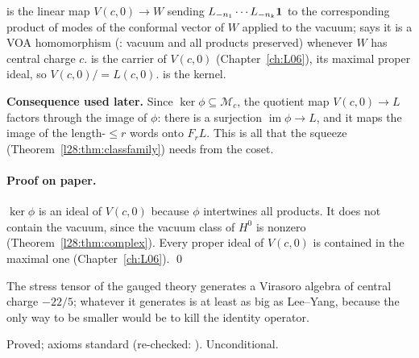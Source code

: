 \begin{dictionary}
 is the linear map $V(c,0)\to W$ sending $L_{-n_1}\cdots L_{-n_k}\mathbf 1$ to the corresponding product of modes of
the conformal vector of $W$ applied to the vacuum;  says it is a VOA homomorphism (: vacuum and
all products preserved) whenever $W$ has central charge $c$.  is the carrier of $V(c,0)$ (Chapter~\ref{ch:L06}),
 its maximal proper ideal, so $V(c,0)/$$=L(c,0)$.  is the kernel.

\textbf{Consequence used later.} Since $\ker\phi\subseteq\mathcal M_c$, the quotient map $V(c,0)\to L$ factors through the image of $\phi$:
there is a surjection $\operatorname{im}\phi\to L$, and it maps the image of the length-$\le r$ words onto $F_rL$. This is all that the
squeeze (Theorem~\ref{l28:thm:classfamily}) needs from the coset.
\end{dictionary}

\paragraph{Proof on paper.} $\ker\phi$ is an ideal of $V(c,0)$ because $\phi$ intertwines all products. It does not contain the vacuum, since the
vacuum class of $H^0$ is nonzero (Theorem~\ref{l28:thm:complex}). Every proper ideal of $V(c,0)$ is contained in the maximal one
(Chapter~\ref{ch:L06}). \qed

\begin{physics}
The stress tensor of the gauged theory generates a Virasoro algebra of central charge $-22/5$; whatever it generates is at least as big as
Lee--Yang, because the only way to be smaller would be to kill the identity operator.
\end{physics}

\begin{status}
Proved; axioms standard (re-checked: ). Unconditional.
\end{status}


